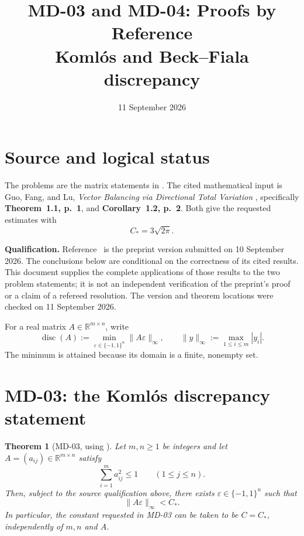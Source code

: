 \documentclass[11pt,a4paper]{article}
\title{\textbf{MD-03 and MD-04: Proofs by Reference}\\[4pt]
  \large Koml\'os and Beck--Fiala discrepancy}
\author{}
\date{11 September 2026}
\newcommand{\R}{\mathbb{R}}
\DeclareMathOperator{\disc}{disc}
\newcommand{\Cstar}{C_{\!*}}
\newtheorem{theorem}{Theorem}
\begin{document}
\maketitle
\vspace{-1.5em}

\section*{Source and logical status}

The problems are the matrix statements in
\cite{MD03,MD04}. The cited mathematical input is Guo, Fang, and Lu,
\emph{Vector Balancing via Directional Total Variation}
\cite{GFL26}, specifically \textbf{Theorem~1.1, p.~1}, and
\textbf{Corollary~1.2, p.~2}. Both give the requested estimates with
\[
  \boxed{\Cstar=3\sqrt{2\pi}.}
\]

\textbf{Qualification.}
Reference~\cite{GFL26} is the preprint version submitted on
10 September 2026. The conclusions below are conditional on the correctness
of its cited results. This document supplies the complete applications of
those results to the two problem statements; it is not an independent
verification of the preprint's proof or a claim of a refereed resolution.
The version and theorem locations were checked on 11 September 2026.

For a real matrix $A\in\R^{m\times n}$, write
\[
 \disc(A):=\min_{\varepsilon\in\{-1,1\}^{n}}
             \|A\varepsilon\|_{\infty},
 \qquad
 \|y\|_{\infty}:=\max_{1\leq i\leq m}|y_i|.
\]
The minimum is attained because its domain is a finite, nonempty set.

\section{MD-03: the Koml\'os discrepancy statement}

\begin{theorem}[MD-03, using {\cite[Theorem~1.1]{GFL26}}]
Let $m,n\geq1$ be integers and let $A=(a_{ij})\in\R^{m\times n}$
satisfy
\begin{equation}\label{eq:komlos-hyp}
  \sum_{i=1}^{m}a_{ij}^{2}\leq1
  \qquad (1\leq j\leq n).
\end{equation}
Then, subject to the source qualification above, there exists
$\varepsilon\in\{-1,1\}^{n}$ such that
\begin{equation}\label{eq:komlos-conclusion}
  \|A\varepsilon\|_{\infty}<\Cstar.
\end{equation}
In particular, the constant requested in MD-03 can be taken to be
$C=\Cstar$, independently of $m,n$ and $A$.
\end{theorem}
\end{document}
